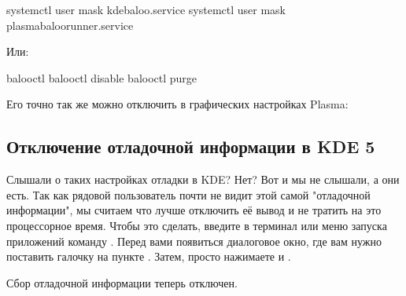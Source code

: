 \documentclass[letterpaper,10pt,russian,openany]{sphinxmanual}
\begin{document}
\sphinxAtStartPar
{}

\begin{sphinxVerbatim}[commandchars=\\\{\}]
systemctl \PYGZhy{}\PYGZhy{}user mask kde\PYGZhy{}baloo.service           
systemctl \PYGZhy{}\PYGZhy{}user mask plasma\PYGZhy{}baloorunner.service
\end{sphinxVerbatim}

\sphinxAtStartPar
Или:

\begin{sphinxVerbatim}[commandchars=\\\{\}]
balooctl                   
balooctl disable                  
balooctl purge                    
\end{sphinxVerbatim}

\sphinxAtStartPar
Его точно так же можно отключить в графических настройках Plasma:

\noindent{}

\ignorespaces 

\subsection{Отключение отладочной информации в KDE 5}
\label{\detokenize{source/de-optimizations:kde-5}}\label{\detokenize{source/de-optimizations:disabling-kde-debug}}\label{\detokenize{source/de-optimizations:index-11}}
\sphinxAtStartPar
Слышали о таких настройках отладки в KDE? Нет? Вот и мы не слышали, а они есть.
Так как рядовой пользователь почти не видит этой самой "отладочной информации",
мы считаем что лучше отключить её вывод и не тратить на это процессорное время.
Чтобы это сделать, введите в терминал или меню запуска приложений команду .
Перед вами появиться диалоговое окно, где вам нужно поставить галочку на пункте .
Затем, просто нажимаете  и .

\sphinxAtStartPar
Сбор отладочной информации теперь отключен.

\noindent{}
\end{document}
